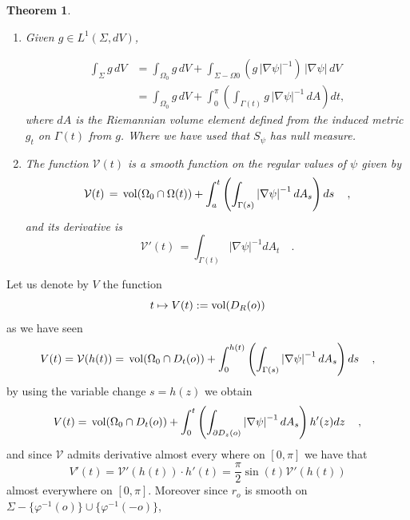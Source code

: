 \documentclass{amsart}
\newtheorem{theorem}{Theorem}[section]
\theoremstyle{definition}
\theoremstyle{remark}
\begin{document}
\begin{theorem}\label{thmCoarea}\
\begin{enumerate}

\item Given $g \in L^1(\Sigma, dV)$,

\begin{equation*}
\begin{aligned}
\int_{\Sigma}g\,dV&=\int_{\Omega_0}g\,dV+\int_{\Sigma-\Omega0}(g\,|\nabla\psi|^{-1})\,|\nabla\psi|\,dV\\
\label{eq:coarea}
&=\int_{\Omega_0}g\,dV+\int_{0}^\pi\left(\int_{\Gamma(t)}g\,|\nabla\psi|^{-1}\,dA\right)dt,
\end{aligned}
\end{equation*}
\noindent where $dA$ is the Riemannian volume element defined from the induced metric $g_t$ on $\Gamma(t)$ from $g$.
Where we have used that $S_\psi$ has null measure. 
\item The function $\mathcal{V}(t)$ is a smooth function on the regular values of $\psi$  given by 
\begin{equation*}
  \mathcal{V}(t) \, = \, {\rm vol}(\Omega_0\cap \Omega(t))+\int_a^t\left(\int_{\Gamma(s)} \left|\nabla \psi\right|^{-1} dA_{s}\right)ds\,
\quad ,
\end{equation*}
and its derivative is
\begin{equation*} \label{eqCoareaDeriv}
  \mathcal{V}'(t) \, = \int_{\Gamma(t)} \left|\nabla \psi\right|^{-1} dA_{t}
\quad .
\end{equation*}
\end{enumerate}
\end{theorem}
Let us denote by $V$ the function
$$
t\mapsto V(t):={\rm vol}(D_R(o))
$$
as we have seen 
\begin{equation}
V(t)=\mathcal{V}(h(t))=\, {\rm vol}(\Omega_0\cap D_t(o))+\int_0^{h(t)}\left(\int_{\Gamma(s)} \left|\nabla \psi\right|^{-1} dA_{s}\right)ds\,
\quad ,
\end{equation}
by using the variable change $s=h(z)$ we obtain
\begin{equation}
V(t)=\, {\rm vol}(\Omega_0\cap D_t(o))+\int_0^{t}\left(\int_{\partial D_z(o)} \left|\nabla \psi\right|^{-1} dA_{s}\right)h'(z)dz\,
\quad ,
\end{equation}
and since $\mathcal{V}$ admits derivative almost every where on $[0,\pi]$ we have that
$$
V'(t)=\mathcal{V}'(h(t))\cdot h'(t)=\frac{\pi}{2}\sin(t)\mathcal{V}'(h(t))
$$
almost everywhere on $[0,\pi]$. Moreover since $r_o$ is smooth on $\Sigma-\{\varphi^{-1}(o)\}\cup \{\varphi^{-1}(-o)\}$, 
\end{document}
